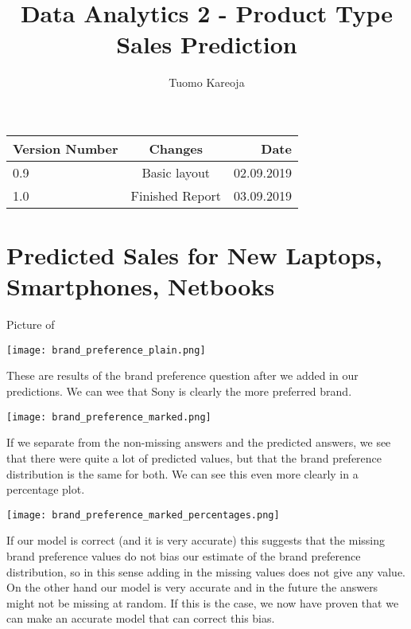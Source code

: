 \documentclass[12pt,a4paper,leqno]{report}
\title{Data Analytics 2 - Product Type Sales Prediction}
\author{Tuomo Kareoja}
\date{}
\theoremstyle{plain}
\theoremstyle{definition}
\theoremstyle{remark}
\begin{document}
\maketitle

\begin{table}[h!]
  \begin{center}
    \begin{tabular}{l|c|r}
      \textbf{Version Number} & \textbf{Changes} & \textbf{Date} \\
      \hline
      0.9 & Basic layout & 02.09.2019\\
      1.0 & Finished Report & 03.09.2019\\
    \end{tabular}
  \end{center}
\end{table}

\newpage

\section{Predicted Sales for New Laptops, Smartphones, Netbooks }

Picture of

\bigskip
{
    \centering
    \texttt{[image: brand\_preference\_plain.png]}
    \par
}
\bigskip

These are results of the brand preference question after we added in our predictions. We can wee that Sony
is clearly the more preferred brand.

\bigskip
{
    \centering
    \texttt{[image: brand\_preference\_marked.png]}
    \par
}
\bigskip

If we separate from the non-missing answers and the predicted answers, we see
that there were quite a lot of predicted values, but that the brand preference distribution
is the same for both. We can see this even more clearly in a percentage plot.

\bigskip
{
    \centering
    \texttt{[image: brand\_preference\_marked\_percentages.png]}
    \par
}
\bigskip

If our model is correct (and it is very accurate) this suggests that the missing brand preference values
do not bias our estimate of the brand preference distribution, so in this sense adding in the missing
values does not give any value. On the other hand our model is very accurate and in the future
the answers might not be missing at random. If this is the case, we now have proven that we can make
an accurate model that can correct this bias.
\end{document}
